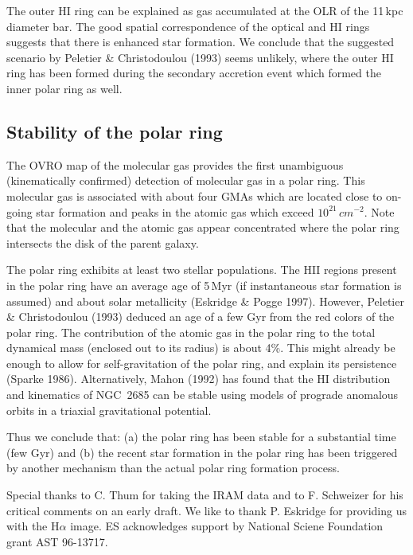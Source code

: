 \documentclass{aastex}
\newcommand{\cms}{cm^{-2}}
\begin{document}
The outer HI ring can be explained as gas accumulated at the OLR of
the 11\,kpc diameter bar. The good spatial correspondence of the
optical and HI rings suggests that there is enhanced star
formation. We conclude that the suggested scenario by Peletier \&
Christodoulou (1993) seems unlikely, where the outer HI ring has been
formed during the secondary accretion event which formed the inner
polar ring as well.

\subsection{Stability of the polar ring}

The OVRO map of the molecular gas provides the first unambiguous
(kinematically confirmed) detection of molecular gas in a polar
ring. This molecular gas is associated with about four GMAs which are
located close to on-going star formation and peaks in the atomic gas
which exceed $10^{21}\,\cms$. Note that the molecular and the atomic
gas appear concentrated where the polar ring intersects the disk of
the parent galaxy. 

The polar ring exhibits at least two stellar populations. The HII
regions present in the polar ring have an average age of 5\,Myr (if
instantaneous star formation is assumed) and about solar metallicity
(Eskridge \& Pogge 1997). However, Peletier \& Christodoulou (1993)
deduced an age of a few Gyr from the red colors of the polar ring.
The contribution of the atomic gas in the polar ring to the total
dynamical mass (enclosed out to its radius) is about 4\%. This might
already be enough to allow for self-gravitation of the polar ring, and
explain its persistence (Sparke 1986). Alternatively, Mahon (1992) has
found that the HI distribution and kinematics of NGC~2685 can be
stable using models of prograde anomalous orbits in a triaxial
gravitational potential.

Thus we conclude that: (a) the polar ring has been stable for a
substantial time (few Gyr) and (b) the recent star formation in the
polar ring has been triggered by another mechanism than the actual polar
ring formation process.

\acknowledgments
Special thanks to C. Thum for taking the IRAM data and to F. Schweizer
for his critical comments on an early draft. We like to thank
P. Eskridge for providing us with the H$\alpha$ image. ES acknowledges
support by National Sciene Foundation grant AST 96-13717.
\end{document}

